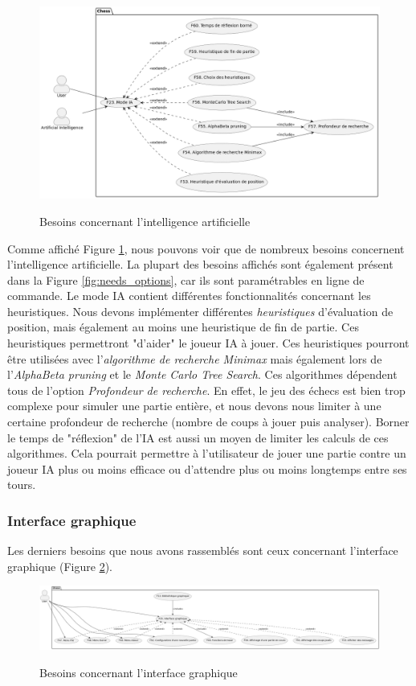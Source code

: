 \documentclass{article}
\begin{document}
\begin{figure}[h]
    \caption{Besoins concernant l'intelligence artificielle}
    \centering
    \includegraphics[width=\textwidth,height=\textheight,keepaspectratio]{needs_ai}
    \label{fig:needs_ai}
\end{figure}

Comme affiché Figure \ref{fig:needs_ai}, nous pouvons voir que de nombreux besoins
concernent l'intelligence artificielle.
La plupart des besoins affichés sont également présent dans la Figure \ref{fig:needs_options}, car ils sont paramétrables
en ligne de commande.
Le mode IA contient différentes fonctionnalités concernant les heuristiques. Nous devons implémenter différentes \textit{heuristiques}
d'évaluation de position, mais également au moins une heuristique de fin de partie. Ces heuristiques permettront "d'aider" le joueur IA
à jouer. Ces heuristiques pourront être utilisées avec l'\textit{algorithme de recherche Minimax} mais également lors de l'\textit{AlphaBeta pruning} 
et le \textit{Monte Carlo Tree Search}. Ces algorithmes dépendent tous de l'option \textit{Profondeur de recherche}. En effet, le jeu des échecs est bien 
trop complexe pour simuler une partie entière, et nous devons nous limiter à une certaine profondeur de recherche (nombre de coups à jouer puis analyser).
Borner le temps de "réflexion" de l'IA est aussi un moyen de limiter les calculs de ces algorithmes. Cela pourrait permettre à l'utilisateur de jouer une partie contre
un joueur IA plus ou moins efficace ou d'attendre plus ou moins longtemps entre ses tours.
\subsubsection{Interface graphique}
Les derniers besoins que nous avons rassemblés sont ceux concernant l'interface graphique (Figure \ref{fig:needs_gui}).
\begin{figure}[h]
    \caption{Besoins concernant l'interface graphique}
    \centering
    \includegraphics[width=\textwidth,height=\textheight,keepaspectratio]{needs_gui}
    \label{fig:needs_gui}
\end{figure}
\end{document}
